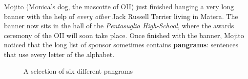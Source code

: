 \usepackage{xcolor}
\usepackage{afterpage}
\usepackage{pifont,mdframed}
\usepackage{multicol}
\usepackage[bottom]{footmisc}



\renewcommand{\inputfile}{\texttt{stdin}}
\renewcommand{\outputfile}{\texttt{stdout}}
\makeatletter
\renewcommand{\this@inputfilename}{\texttt{stdin}}
\renewcommand{\this@outputfilename}{\texttt{stdout}}
\makeatother


Mojito (Monica's dog, the mascotte of OII) just finished hanging a very long
banner with the help of \emph{every other} Jack Russell Terrier living in
Matera. The banner now sits in the hall of the \emph{Pentasuglia High-School},
where the awards ceremony of the OII will soon take place. Once finished with
the banner, Mojito noticed that the long list of sponsor sometimes contains
\textbf{pangrams}: sentences that use every letter of the alphabet.

\begin{figure}[H]
  \centering
  \caption{A selection of six different pangrams\footnotemark}
\end{figure}

